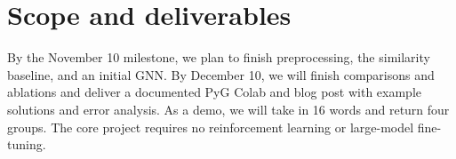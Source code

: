 \documentclass{article}
\begin{document}
\section{Scope and deliverables}
By the November 10 milestone, we plan to finish preprocessing, the similarity baseline, and an initial GNN. By December 10, we will finish comparisons and ablations and deliver a documented PyG Colab and blog post with example solutions and error analysis. As a demo, we will take in 16 words and return four groups. The core project requires no reinforcement learning or large-model fine-tuning.


\end{document}
